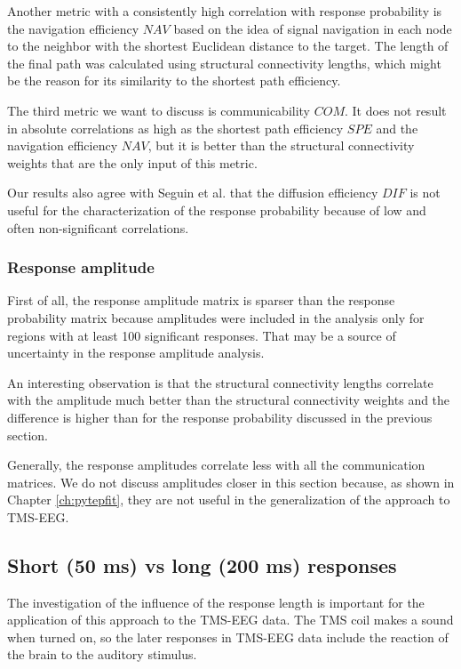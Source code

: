 Another metric with a consistently high correlation with response probability is the navigation efficiency $NAV$ based on the idea of signal navigation in each node to the neighbor with the shortest Euclidean distance to the target. The length of the final path was calculated using structural connectivity lengths, which might be the reason for its similarity to the shortest path efficiency.

The third metric we want to discuss is communicability $COM$. It does not result in absolute correlations as high as the shortest path efficiency $SPE$ and the navigation efficiency $NAV$, but it is better than the structural connectivity weights that are the only input of this metric. 

Our results also agree with Seguin et al. that the diffusion efficiency $DIF$ is not useful for the characterization of the response probability because of low and often non-significant correlations. 

\subsubsection{Response amplitude}

First of all, the response amplitude matrix is sparser than the response probability matrix because amplitudes were included in the analysis only for regions with at least 100 significant responses. That may be a source of uncertainty in the response amplitude analysis. 

An interesting observation is that the structural connectivity lengths correlate with the amplitude much better than the structural connectivity weights and the difference is higher than for the response probability discussed in the previous section.

Generally, the response amplitudes correlate less with all the communication matrices. We do not discuss amplitudes closer in this section because, as shown in Chapter \ref{ch:pytepfit}, they are not useful in the generalization of the approach to TMS-EEG.

\subsection{Short (50 ms) vs long (200 ms) responses}\label{sec:response-length_F-Tract}

The investigation of the influence of the response length is important for the application of this approach to the TMS-EEG data. The TMS coil makes a sound when turned on, so the later responses in TMS-EEG data include the reaction of the brain to the auditory stimulus. 

